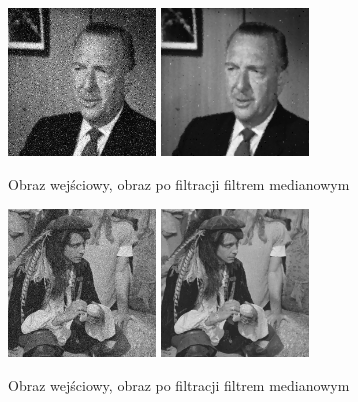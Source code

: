 \documentclass[final,a4paper,openany,12pt]{mwbk}
\begin{document}
\begin{figure}[H]
	\begin{center}
		\includegraphics[width=0.35\textwidth]{gentelman_gray_noise}
		\includegraphics[width=0.35\textwidth]{gentelman_gray_noise_median_result}
	\end{center}
	\caption{Obraz wejściowy, obraz po filtracji filtrem medianowym}
\end{figure}

\begin{figure}[H]
	\begin{center}
		\includegraphics[width=0.35\textwidth]{pirate_gray_noise}
		\includegraphics[width=0.35\textwidth]{pirate_gray_noise_median_result}
	\end{center}
	\caption{Obraz wejściowy, obraz po filtracji filtrem medianowym}
\end{figure}
\end{document}
